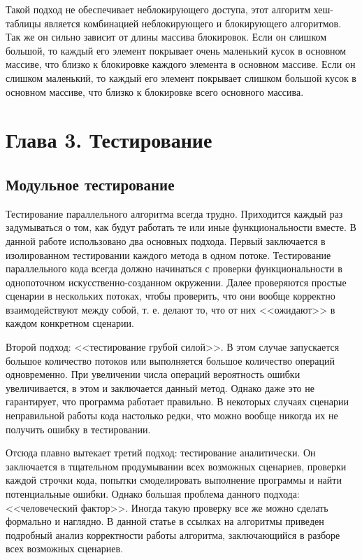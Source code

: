 \documentclass[12pt]{article}
\begin{document}
{				\par Такой подход не обеспечивает неблокирующего доступа, этот алгоритм хеш-таблицы является комбинацией неблокирующего и блокирующего алгоритмов. Так же он сильно зависит от длины массива блокировок. Если он слишком большой, то каждый его элемент покрывает очень маленький кусок в основном массиве, что близко к блокировке каждого элемента в основном массиве. Если он слишком маленький, то каждый его элемент покрывает слишком большой кусок в основном массиве, что близко к блокировке всего основного массива.
				
		\newpage
		
		\section{Глава 3. Тестирование}
				\subsection{Модульное тестирование}
					\par Тестирование параллельного алгоритма всегда трудно. Приходится каждый раз задумываться о том, как будут работать те или иные функциональности вместе. В данной работе использовано два основных подхода. Первый заключается в изолированном тестировании каждого метода в одном потоке. Тестирование параллельного кода всегда должно начинаться с проверки функциональности в однопоточном искусственно-созданном окружении. Далее проверяются простые сценарии в нескольких потоках, чтобы проверить, что они вообще корректно взаимодействуют между собой, т. е. делают то, что от них <<ожидают>> в каждом конкретном сценарии.
					\par Второй подход: <<тестирование грубой силой>>. В этом случае запускается большое количество потоков или выполняется большое количество операций одновременно. При увеличении числа операций вероятность ошибки увеличивается, в этом и заключается данный метод. Однако даже это не гарантирует, что программа работает правильно. В некоторых случаях сценарии неправильной работы кода настолько редки, что можно вообще никогда их не получить ошибку в тестировании.
					\par Отсюда плавно вытекает третий подход: тестирование аналитически. Он заключается в тщательном продумывании всех возможных сценариев, проверки каждой строчки кода, попытки смоделировать выполнение программы и найти потенциальные ошибки. Однако большая проблема данного подхода: <<человеческий фактор>>. Иногда такую проверку все же можно сделать формально и наглядно. В данной статье в ссылках на алгоритмы приведен подробный анализ корректности работы алгоритма, заключающийся в разборе всех возможных сценариев.
}
\end{document}
